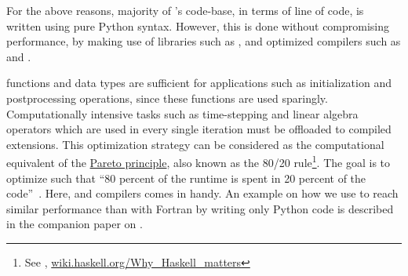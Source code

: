 For the above reasons, majority of 's code-base, in terms of
line of code, is written using pure Python syntax. However, this is done
without compromising performance, by making use of libraries such as \Numpy,
and optimized compilers such as  and .

\Numpy functions and data types are sufficient for applications such as
initialization and postprocessing operations, since these functions are used
sparingly. Computationally intensive tasks such as time-stepping and linear
algebra operators which are used in every single iteration must be offloaded to
compiled extensions.
%
This optimization strategy can be considered as the computational equivalent of
the \href{https://en.wikipedia.org/wiki/Pareto_principle}{Pareto principle}, also
known as the 80/20 rule\footnote{See \citet{behnel_cython2011},
\href{https://wiki.haskell.org/Why_Haskell_matters}{%
wiki.haskell.org/Why\_Haskell\_matters}}.
%
The goal is to optimize such that ``80 percent of the runtime is spent in
20 percent of the code''~\cite[]{meyers2012effective}.
%
Here,  \citep{behnel_cython2011} and 
\citep{guelton2018pythran} compilers comes in handy.
%
An example on how we use  to reach similar performance than with
Fortran by writing only Python code is described in the companion paper on
 \citep{fluidfft}.




